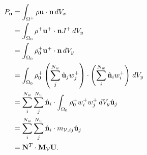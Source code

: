 \documentclass[11pt]{report}
\begin{document}
\begin{align}
    P_{\mathbf{n}} &= \int_{\Omega^+} \rho \mathbf{u} \cdot \mathbf{n} \, dV_x \nonumber \\
    &= \int_{\Omega_0} \rho^+ \mathbf{u}^+ \cdot \mathbf{n} J^+ \, dV_y \nonumber \\
    &= \int_{\Omega_0} \rho^+_0 \mathbf{u}^+ \cdot \mathbf{n} \, dV_y \nonumber \\
    &= \int_{\Omega_0} \rho^+_0 \left ( \sum_j^{N_w} \hat{\mathbf{u}}_j w^+_j \right ) \cdot \left ( \sum_i^{N_w} \hat{\mathbf{n}}_i w_i^+ \right ) \, dV_y \nonumber \\
    &= \sum_i^{N_w} \sum_j^{N_w} \hat{\mathbf{n}}_i \cdot \int_{\Omega_0} \rho_0^+ w_i^+ w_j^+ \, dV_y \hat{\mathbf{u}}_j \nonumber \\
    &= \sum_i^{N_w} \sum_j^{N_w} \hat{\mathbf{n}}_i \cdot m_{\mathcal{V},ij} \hat{\mathbf{u}}_j \nonumber \\
    &= \mathbf{N}^T \cdot \mathbf{M}_\mathcal{V} \mathbf{U}.
\end{align}
\end{document}
